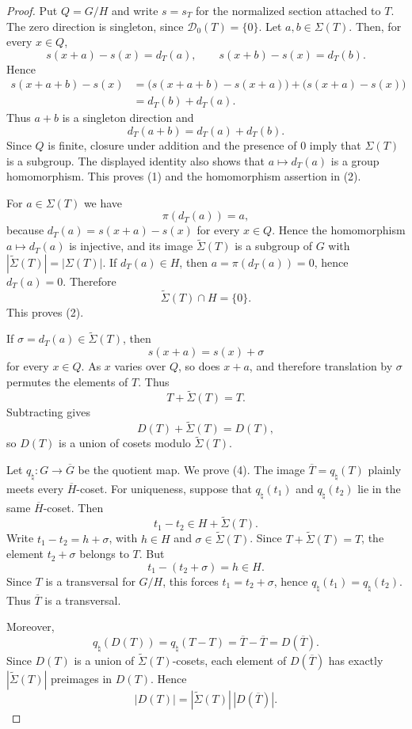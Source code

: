 \documentclass[reqno]{amsart}
\numberwithin{equation}{section}
\theoremstyle{definition}
\begin{document}
\begin{proof}
Put $Q=G/H$ and write $s=s_T$ for the normalized section attached to $T$.
The zero direction is singleton, since $\mathcal D_0(T)=\{0\}$.  Let
$a,b\in\Sigma(T)$.  Then, for every $x\in Q$,
\[
  s(x+a)-s(x)=d_T(a),
  \qquad
  s(x+b)-s(x)=d_T(b).
\]
Hence
\[
\begin{aligned}
  s(x+a+b)-s(x)
  &=\bigl(s(x+a+b)-s(x+a)\bigr)+\bigl(s(x+a)-s(x)\bigr) \\
  &=d_T(b)+d_T(a).
\end{aligned}
\]
Thus $a+b$ is a singleton direction and
\[
  d_T(a+b)=d_T(a)+d_T(b).
\]
Since $Q$ is finite, closure under addition and the presence of $0$ imply that
$\Sigma(T)$ is a subgroup.  The displayed identity also shows that
$a\mapsto d_T(a)$ is a group homomorphism.  This proves (1) and the homomorphism
assertion in (2).

For $a\in\Sigma(T)$ we have
\[
  \pi(d_T(a))=a,
\]
because $d_T(a)=s(x+a)-s(x)$ for every $x\in Q$.  Hence the homomorphism
$a\mapsto d_T(a)$ is injective, and its image $\widetilde\Sigma(T)$ is a
subgroup of $G$ with $|\widetilde\Sigma(T)|=|\Sigma(T)|$.  If
$d_T(a)\in H$, then $a=\pi(d_T(a))=0$, hence $d_T(a)=0$.  Therefore
\[
  \widetilde\Sigma(T)\cap H=\{0\}.
\]
This proves (2).

If $\sigma=d_T(a)\in\widetilde\Sigma(T)$, then
\[
  s(x+a)=s(x)+\sigma
\]
for every $x\in Q$.  As $x$ varies over $Q$, so does $x+a$, and therefore
translation by $\sigma$ permutes the elements of $T$.  Thus
\[
  T+\widetilde\Sigma(T)=T.
\]
Subtracting gives
\[
  D(T)+\widetilde\Sigma(T)=D(T),
\]
so $D(T)$ is a union of cosets modulo $\widetilde\Sigma(T)$.

Let $q_{\natural}:G\to\overline G$ be the quotient map.  We prove (4).  The
image $\overline T=q_{\natural}(T)$ plainly meets every
$\overline H$-coset.  For uniqueness, suppose that $q_{\natural}(t_1)$ and
$q_{\natural}(t_2)$ lie in the same $\overline H$-coset.  Then
\[
  t_1-t_2\in H+\widetilde\Sigma(T).
\]
Write $t_1-t_2=h+\sigma$, with $h\in H$ and
$\sigma\in\widetilde\Sigma(T)$.  Since $T+\widetilde\Sigma(T)=T$, the element
$t_2+\sigma$ belongs to $T$.  But
\[
  t_1-(t_2+\sigma)=h\in H.
\]
Since $T$ is a transversal for $G/H$, this forces $t_1=t_2+\sigma$, hence
$q_{\natural}(t_1)=q_{\natural}(t_2)$.  Thus $\overline T$ is a transversal.

Moreover,
\[
  q_{\natural}(D(T))=q_{\natural}(T-T)=\overline T-\overline T=D(\overline T).
\]
Since $D(T)$ is a union of $\widetilde\Sigma(T)$-cosets, each element of
$D(\overline T)$ has exactly $|\widetilde\Sigma(T)|$ preimages in $D(T)$.  Hence
\[
  |D(T)|=|\widetilde\Sigma(T)|\,|D(\overline T)|.
\]


\end{proof}
\end{document}
